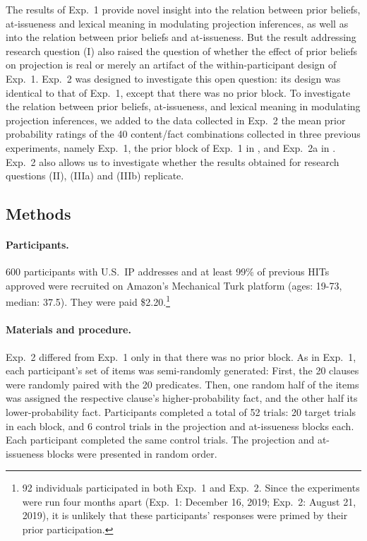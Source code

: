 \documentclass[11pt,fleqn]{article}
\newcommand{\6}{\mbox{$[\hspace*{-.6mm}[$}}
\newcommand{\9}{\mbox{$]\hspace*{-.6mm}]$}}
\begin{document}
The results of Exp.~1 provide novel insight into the relation between prior beliefs, at-issueness and lexical meaning in modulating projection inferences, as well as into the relation between prior beliefs and at-issueness. But the result addressing research question (I) also raised the question of whether the effect of prior beliefs on projection is real or merely an artifact of the within-participant design of Exp.~1. Exp.~2 was designed to investigate this open question: its design was identical to that of Exp.~1, except that there was no prior block. To investigate the relation between prior beliefs, at-issueness, and lexical meaning in modulating projection inferences, we added to the data collected in Exp.~2 the mean prior probability ratings of the 40 content/fact combinations collected in three previous experiments, namely Exp.~1, the prior block of Exp.~1 in \citealt{degen-tonhauser-openmind}, and Exp.~2a in \citealt{degen-tonhauser-openmind}. Exp.~2 also allows us to investigate whether the results obtained for research questions (II), (IIIa) and (IIIb) replicate.  

\subsection{Methods}

\paragraph{Participants.} 600 participants with U.S.\ IP addresses and at least 99\% of previous HITs approved were recruited on Amazon's Mechanical Turk platform (ages: 19-73, median: 37.5). They were paid \$2.20.\footnote{92 individuals participated in both Exp.~1 and Exp.~2. Since the experiments were run four months apart (Exp.~1: December 16, 2019; Exp.~2: August 21, 2019), it is unlikely that these participants' responses were primed by their prior participation.}

\paragraph{Materials and procedure.}  Exp.~2 differed from Exp.~1 only in that there was no prior block. As in Exp.~1, each participant's set of items was semi-randomly generated: First, the 20 clauses were randomly paired with the 20 predicates. Then, one random half of the items was assigned the respective clause's higher-probability fact, and the other half its lower-probability fact. Participants completed a total of 52 trials: 20 target trials in each block, and 6 control trials in the projection and at-issueness blocks each. Each participant completed the same control trials. The projection and at-issueness blocks were presented in random order. 
\end{document}

